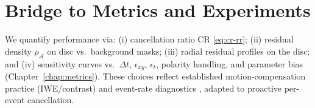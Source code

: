 \section{Bridge to Metrics and Experiments}
\label{sec:metrics-bridge}
We quantify performance via: (i) cancellation ratio $\mathrm{CR}$ \eqref{eq:cr-rr}; (ii) residual density $\rho_\mathcal{A}$ on disc vs.\ background masks; (iii) radial residual profiles on the disc; and (iv) sensitivity curves vs.\ $\Delta t$, $\epsilon_{xy}$, $\epsilon_t$, polarity handling, and parameter bias (Chapter~\ref{chap:metrics}). These choices reflect established motion-compensation practice (IWE/contrast) and event-rate diagnostics \cite{Bardow2016SOFIE,Gallego2018CMax,Stoffregen2019Segmentation,Gallego2020Survey}, adapted to proactive per-event cancellation.
